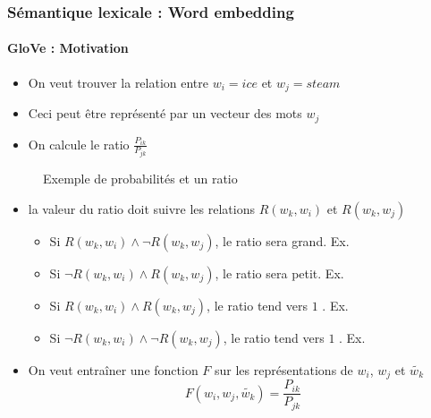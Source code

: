 \documentclass[xcolor=table]{beamer}
\begin{document}
\begin{frame}
\frametitle{Sémantique lexicale : Word embedding}
\framesubtitle{GloVe : Motivation}
	
\begin{minipage}{.5\textwidth}
	\begin{itemize}
		\item On veut trouver la relation entre $w_i = ice$ et $w_j = steam$
		\item Ceci peut être représenté par un vecteur des mots $w_j$ 
		\item On calcule le ratio $\frac{P_{ik}}{P_{jk}}$
	\end{itemize}
\end{minipage}
\begin{minipage}{.48\textwidth}
	\begin{figure}
		\caption{Exemple de probabilités et un ratio \cite{2014-pennington-al}}
	\end{figure}
\end{minipage}
	
\begin{itemize}
	\item la valeur du ratio doit suivre les relations $R(w_k, w_i)$ et $R(w_k, w_j)$
	\begin{itemize}
		\item Si $R(w_k, w_i) \wedge \neg R(w_k, w_j)$, le ratio sera grand. Ex. 
		\item Si $\neg R(w_k, w_i) \wedge R(w_k, w_j)$, le ratio sera petit. Ex. 
		\item Si $R(w_k, w_i) \wedge R(w_k, w_j)$, le ratio tend vers $1$ . Ex. 
		\item Si $\neg R(w_k, w_i) \wedge \neg R(w_k, w_j)$, le ratio tend vers $1$ . Ex. 
	\end{itemize}
	\item On veut entraîner une fonction $F$ sur les représentations de $w_i$, $w_j$ et $\tilde{w_k}$
	\vspace{-6pt}\[F(w_i, w_j, \tilde{w_k}) = \frac{P_{ik}}{P_{jk}}\]
\end{itemize}
	
\end{frame}
\end{document}
